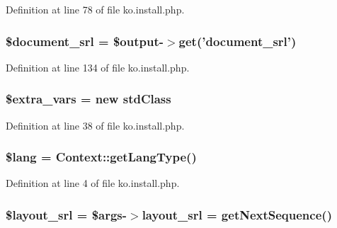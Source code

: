 Definition at line 78 of file ko.\+install.\+php.

\hypertarget{ko_8install_8php_a14522e7fff0604a8372c75b4a0fbc0fd}{
\subsubsection[{\$document\+\_\+srl}]{\setlength{\rightskip}{0pt plus 5cm}\$document\+\_\+srl = \$output-\/$>$get('document\+\_\+srl')}}\label{ko_8install_8php_a14522e7fff0604a8372c75b4a0fbc0fd}


Definition at line 134 of file ko.\+install.\+php.

\hypertarget{ko_8install_8php_ae9f3d13d48d464400201d7ec024d3a45}{
\subsubsection[{\$extra\+\_\+vars}]{\setlength{\rightskip}{0pt plus 5cm}\${\bf extra\+\_\+vars} = new std\+Class}}\label{ko_8install_8php_ae9f3d13d48d464400201d7ec024d3a45}


Definition at line 38 of file ko.\+install.\+php.

\hypertarget{ko_8install_8php_a7714b111b644017933931ec69a154102}{
\subsubsection[{\$lang}]{\setlength{\rightskip}{0pt plus 5cm}\$lang = {\bf Context\+::get\+Lang\+Type}()}}\label{ko_8install_8php_a7714b111b644017933931ec69a154102}


Definition at line 4 of file ko.\+install.\+php.

\hypertarget{ko_8install_8php_a77889723c4aa360089caae223118d413}{
\subsubsection[{\$layout\+\_\+srl}]{\setlength{\rightskip}{0pt plus 5cm}\${\bf layout\+\_\+srl} = \$args-\/$>${\bf layout\+\_\+srl} = {\bf get\+Next\+Sequence}()}}\label{ko_8install_8php_a77889723c4aa360089caae223118d413}


